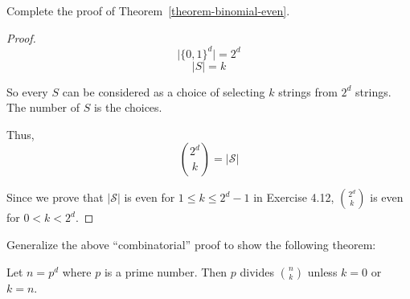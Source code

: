 
\begin{exercise}
  Complete the proof of Theorem~\ref{theorem-binomial-even}.
\end{exercise}

\begin{proof}
$$ \lvert \{0, 1\}^d \rvert = 2^d $$
$$ \lvert S \rvert = k $$ 

So every $ S $ can be considered as a choice of selecting $k$ strings from $2^d$ strings. The number of $S$ is the choices.

Thus, $${2^d \choose k} = \lvert \mathcal{S} \rvert$$ 

Since we prove that $\lvert \mathcal{S} \rvert$ is even for $1 \leq k \leq 2^d - 1$ in Exercise 4.12, ${2^d \choose k}$ is even for $0 < k < 2^d$.
\end{proof}



\begin{exerciseD}
  Generalize the above ``combinatorial'' proof to show the following theorem:
  \begin{theorem}
 Let $n = p^d$ where $p$ is a prime number. Then $p$ divides
 ${n \choose k}$ unless $k=0$ or $k=n$. 
 \end{theorem}
\end{exerciseD}

